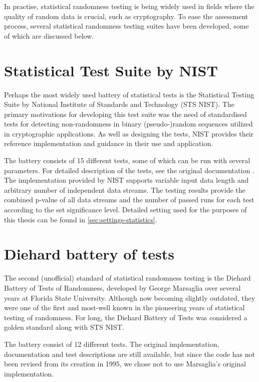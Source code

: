 \documentclass[12pt,oneside]{fithesis2}		%
\renewcommand{\_}{\leavevmode \kern0.0em\vbox{\hrule width0.4em}}
\begin{document}
\noindent
In practise, statistical randomness testing is being widely used in fields where the quality of random data is crucial, 
such as cryptography. To ease the assessment process, several statistical randomness testing suites have been developed, 
some of which are discussed below.

\section{Statistical Test Suite by NIST}
\label{sec:sts-nist}

Perhaps the most widely used battery of statistical tests is the Statistical Testing Suite 
by National Institute of Standards and Technology (STS NIST).
The primary motivations for developing this test suite was the need of standardised tests for detecting non-randomness 
in binary (pseudo-)random sequences utilized in cryptographic applications. As well as designing the tests,
NIST provides their reference implementation and guidance in their use and application. \parencite{sts-nist}

The battery consists of 15 different tests, some of which can be run with several parameters. 
For detailed description of the tests, see the original documentation \parencite{sts-nist-documentation}. 
The implementation provided by NIST supports variable input data length and arbitrary number of independent data streams. 
The testing results provide the combined p-value of all data streams and the number of passed runs for each test 
according to the set significance level. 
Detailed setting used for the purposes of this thesis can be found in \autoref{sec:settings-statistics}.

\section{Diehard battery of tests}
\label{sec:diehard}

The second (unofficial) standard of statistical randomness testing is the Diehard Battery of Tests of Randomness, 
developed by George Marsaglia over several years at Florida State University. \parencite{diehard} 
Although now becoming slightly outdated, they were one of the first and most-well known 
in the pioneering years of statistical testing of randomness. 
For long, the Diehard Battery of Tests was considered a golden standard along with STS NIST.

The battery consist of 12 different tests. The original implementation, documentation and test descriptions are still available,
but since the code has not been revised from its creation in 1995, we chose not to use Marsaglia's original implementation.
\end{document}
